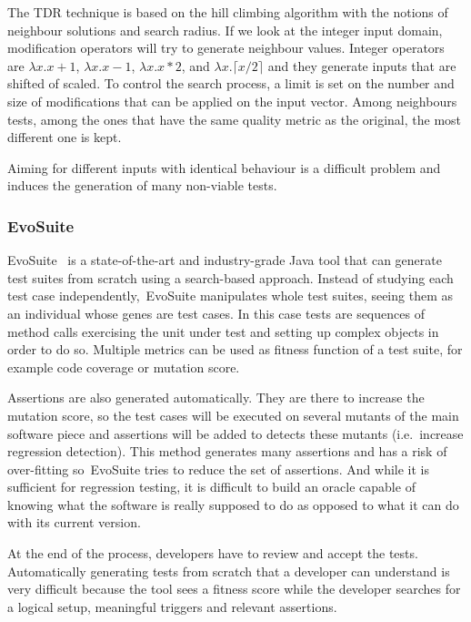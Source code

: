 \documentclass[11pt]{sdm}
\newcommand{\evosuite}{EvoSuite\xspace}
\begin{document}
The TDR technique is based on the hill climbing algorithm with the notions of neighbour solutions and search radius.
If we look at the integer input domain, modification operators will try to generate neighbour values.
Integer operators are $\lambda x.x + 1$, $\lambda x.x - 1$, $\lambda x.x * 2$, and $\lambda x.\lceil x / 2\rceil$ and they generate inputs that are shifted of scaled.
To control the search process, a limit is set on the number and size of modifications that can be applied on the input vector.
Among neighbours tests, among the ones that have the same quality metric as the original, the most different one is kept.

Aiming for different inputs with identical behaviour is a difficult problem and induces the generation of many non-viable tests.

\subsubsection{EvoSuite}
\label{evosuite}
\evosuite{}~\cite{fraser2011evosuite} is a state-of-the-art and industry-grade Java tool that can generate test suites from scratch using a search-based approach.
Instead of studying each test case independently,~\evosuite{} manipulates whole test suites, seeing them as an individual whose genes are test cases.
In this case tests are sequences of method calls exercising the unit under test and setting up complex objects in order to do so.
Multiple metrics can be used as fitness function of a test suite, for example code coverage or mutation score.

Assertions are also generated automatically.
They are there to increase the mutation score, so the test cases will be executed on several mutants of the main software piece and assertions will be added to detects these mutants (i.e.\ increase regression detection).
This method generates many assertions and has a risk of over-fitting so~\evosuite{} tries to reduce the set of assertions.
And while it is sufficient for regression testing, it is difficult to build an oracle capable of knowing what the software is really supposed to do as opposed to what it can do with its current version.

At the end of the process, developers have to review and accept the tests.
Automatically generating tests from scratch that a developer can understand is very difficult because the tool sees a fitness score while the developer searches for a logical setup, meaningful triggers and relevant assertions.
\end{document}
